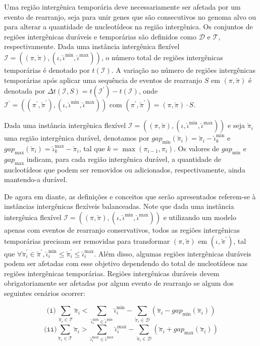 Uma região intergênica temporária deve necessariamente ser afetada por um evento de rearranjo, seja para unir genes que são consecutivos no genoma alvo ou para alterar a quantidade de nucleotídeos na região intergênica. Os conjuntos de regiões intergênicas duráveis e temporárias são definidos como $\mathcal{D}$ e $\mathcal{T}$, respectivamente. Dada uma instância intergênica flexível $\mathcal{I} = ((\pi,\breve\pi),(\iota,\breve\iota^{\min},\breve\iota^{\max}))$, o número total de regiões intergênicas temporárias é denotado por $t(\mathcal{I})$. A variação no número de regiões intergênicas temporárias após aplicar uma sequência de eventos de rearranjo $S$ em $(\pi,\breve\pi)$ é denotada por  $\Delta t(\mathcal{I},S) = t(\mathcal{I}^{\prime}) - t(\mathcal{I})$, onde $\mathcal{I}^{\prime} = ((\pi^{\prime}, \breve\pi^{\prime}),(\iota,\breve\iota^{\min},\breve\iota^{\max}))$ com $(\pi^{\prime}, \breve\pi^{\prime}) = (\pi, \breve\pi) \cdot S$.

Dada uma instância intergênica flexível $\mathcal{I} = ((\pi,\breve\pi),(\iota,\breve\iota^{\min},\breve\iota^{\max}))$ e seja $\breve\pi_i$ uma região intergênica durável, denotamos por $gap_{\min}(\breve\pi_i) = \breve\pi_i - \breve\iota^{\min}_k$ e $gap_{\max}(\breve\pi_i) = \breve\iota^{\max}_k - \breve\pi_i$, tal que $k = \max(\pi_{i-1}, \pi_i)$. Os valores de $gap_{\min}$ e $gap_{\max}$ indicam, para cada região intergênica durável, a quantidade de nucleotídeos que podem ser removidos ou adicionados, respectivamente, ainda mantendo-a durável.

De agora em diante, as definições e conceitos que serão apresentados referem-se à instâncias intergênicas flexíveis balanceadas. Note que dada uma instância intergênica flexível $\mathcal{I} = ((\pi,\breve\pi),(\iota,\breve\iota^{\min},\breve\iota^{\max}))$ e utilizando um modelo apenas com eventos de rearranjo conservativos, todos as regiões intergênicas temporárias precisam ser removidas para transformar $(\pi,\breve\pi)$ em $(\iota,\breve\pi^{\prime})$, tal que $\forall \breve\pi^{\prime}_i \in \breve\pi^{\prime}, \breve\iota^{\min}_i \le \breve\pi^{\prime}_i \le \breve\iota^{\max}_i$. Além disso, algumas regiões intergênicas duráveis podem ser afetadas com esse objetivo dependendo do total de nucleotídeos nas regiões intergênicas temporárias. Regiões intergênicas duráveis devem obrigatoriamente ser afetadas por algum evento de rearranjo se algum dos seguintes cenários ocorrer:

$$\texttt{(i)}~\sum_{\breve\pi_i \in \mathcal{T}} \breve\pi_i < \sum_{\breve\iota_{i}^{\min}  \in \breve\iota^{\min}} \breve\iota_{i}^{\min} - \sum_{\breve\pi_i \in \mathcal{D}} (\breve\pi_i - gap_{\min}(\breve\pi_i))$$
$$\texttt{(ii)}\sum_{\breve\pi_i \in \mathcal{T}} \breve\pi_i > \sum_{\breve\iota_{i}^{\max}  \in \breve\iota^{\max}} \breve\iota_{i}^{\max} - \sum_{\breve\pi_i \in \mathcal{D}} (\breve\pi_i + gap_{\max}(\breve\pi_i))$$


